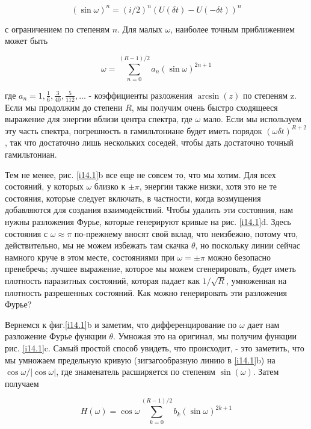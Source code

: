 \documentclass[main.tex]{subfiles}
\begin{document}
\begin{equation}\label{14.5}
	(\sin \omega)^{n}=(i / 2)^{n}(U(\delta t)-U(-\delta t))^{n}
\end{equation}

с ограничением по степеням $n$. Для малых $\omega$, наиболее точным приближением может быть

\begin{equation}\label{14.6}
	\omega=\sum_{n=0}^{(R-1) / 2} a_{n}(\sin \omega)^{2 n+1}
\end{equation}

где $a_n = 1, \frac 1 6, \frac{3}{40}, \frac{5}{112},\ldots$ - коэффициенты разложения $\arcsin(z)$ по степеням z. Если мы продолжим до степени $R$, мы получим очень быстро сходящееся выражение для энергии вблизи центра спектра, где $\omega$ мало. Если мы используем эту часть спектра, погрешность в гамильтониане будет иметь порядок $(\omega\delta t)^{R+2}$, так что достаточно лишь нескольких соседей, чтобы дать достаточно точный гамильтониан.

Тем не менее, рис. \ref{i14.1}b все еще не совсем то, что мы хотим. Для всех состояний, у которых $\omega$ близко к $\pm\pi$, энергии также низки, хотя это не те состояния, которые следует включать, в частности, когда возмущения добавляются для создания взаимодействий. Чтобы удалить эти состояния, нам нужны разложения Фурье, которые генерируют кривые на рис. \ref{i14.1}d. Здесь состояния с $\omega\approx\pi$ по-прежнему вносят свой вклад, что неизбежно, потому что, действительно, мы не можем избежать там скачка $\theta$, но поскольку линии сейчас намного круче в этом месте, состояниями при $\omega = \pm\pi$ можно безопасно пренебречь; лучшее выражение, которое мы можем сгенерировать, будет иметь плотность паразитных состояний, которая падает как $1/\sqrt{R}$, умноженная на плотность разрешенных состояний. Как можно генерировать эти разложения Фурье?

Вернемся к фиг.\ref{i14.1}b и заметим, что дифференцирование по $\omega$ дает нам разложение Фурье функции $\theta$. Умножая это на оригинал, мы получим функции рис. \ref{i14.1}c. Самый простой способ увидеть, что происходит, - это заметить, что мы умножаем предельную кривую (зигзагообразную линию в \ref{i14.1}b) на $\cos\omega/|\cos\omega|$, где знаменатель расширяется по степеням $\sin(\omega)$. Затем получаем

\begin{equation}\label{14.7}
	H(\omega)=\cos \omega \sum_{k=0}^{(R-1) / 2} b_{k}(\sin \omega)^{2 k+1}
\end{equation}
\end{document}
